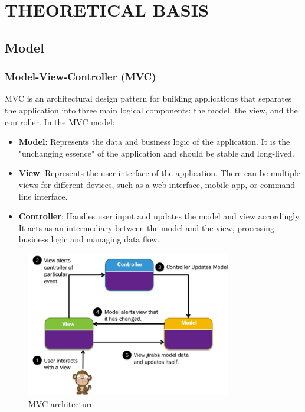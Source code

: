 \section{THEORETICAL BASIS}

\subsection{Model}

\subsubsection{Model-View-Controller (MVC)}

MVC is an architectural design pattern for building applications that separates the application into three main logical components: the model, the view, and the controller. In the MVC model:

\begin{itemize}
    \item \textbf{Model}: Represents the data and business logic of the application. It is the "unchanging essence" of the application and should be stable and long-lived.

    \item \textbf{View}: Represents the user interface of the application. There can be multiple views for different devices, such as a web interface, mobile app, or command line interface.

    \item \textbf{Controller}: Handles user input and updates the model and view accordingly. It acts as an intermediary between the model and the view, processing business logic and managing data flow.
\end{itemize}

\begin{figure}[H]
    \centering
    \includegraphics[width=0.8\textwidth]{assets/images/Research/System/MVC.png}
    \caption{MVC architecture}
    \label{fig:mvc}
\end{figure}

